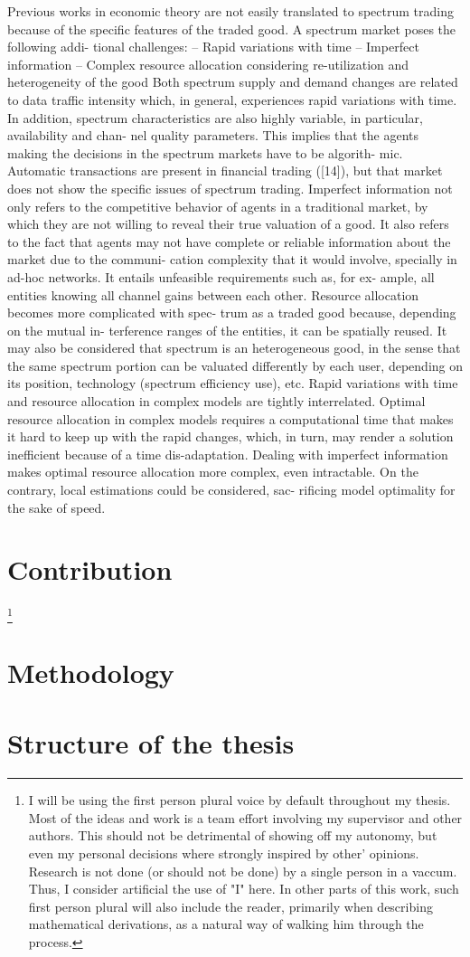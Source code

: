 Previous works in economic theory are not easily translated to spectrum trading because of the specific features of the traded good. A spectrum market poses the following addi- tional challenges:
– Rapid variations with time
– Imperfect information
– Complex resource allocation considering re-utilization
and heterogeneity of the good
Both spectrum supply and demand changes are related to data traffic intensity which, in general, experiences rapid variations with time. In addition, spectrum characteristics are also highly variable, in particular, availability and chan- nel quality parameters. This implies that the agents making the decisions in the spectrum markets have to be algorith- mic. Automatic transactions are present in financial trading ([14]), but that market does not show the specific issues of spectrum trading.
Imperfect information not only refers to the competitive behavior of agents in a traditional market, by which they are not willing to reveal their true valuation of a good. It also refers to the fact that agents may not have complete or reliable information about the market due to the communi- cation complexity that it would involve, specially in ad-hoc
networks. It entails unfeasible requirements such as, for ex- ample, all entities knowing all channel gains between each other.
Resource allocation becomes more complicated with spec- trum as a traded good because, depending on the mutual in- terference ranges of the entities, it can be spatially reused. It may also be considered that spectrum is an heterogeneous good, in the sense that the same spectrum portion can be valuated differently by each user, depending on its position, technology (spectrum efficiency use), etc.
Rapid variations with time and resource allocation in complex models are tightly interrelated. Optimal resource allocation in complex models requires a computational time that makes it hard to keep up with the rapid changes, which, in turn, may render a solution inefficient because of a time dis-adaptation. Dealing with imperfect information makes optimal resource allocation more complex, even intractable. On the contrary, local estimations could be considered, sac- rificing model optimality for the sake of speed.
\section{Contribution}
\footnote{I will be using the first person plural voice by default throughout my thesis. Most of the ideas and work is a team effort involving my supervisor and other authors. This should not be detrimental of showing off my autonomy, but even my personal decisions where strongly inspired by other' opinions. Research is not done (or should not be done) by a single person in a vaccum. Thus, I consider artificial the use of "I" here. In other parts of this work, such first person plural will also include the reader, primarily when describing mathematical derivations, as a natural way of walking him through the process.}
\section{Methodology}
\section{Structure of the thesis}

